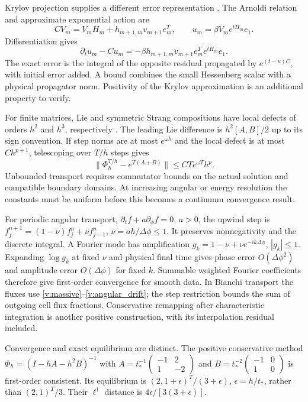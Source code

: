 Krylov projection supplies a different error representation \cite{vSaad1992}. The Arnoldi relation and approximate exponential action are
\begin{equation}
 CV_m=V_mH_m+h_{m+1,m}v_{m+1}e_m^T,\qquad
 u_m=\beta V_me^{tH_m}e_1 .
 \label{v:arnoldi_relation}
\end{equation}
Differentiation gives
\begin{equation}
 \partial_tu_m-Cu_m=
 -\beta h_{m+1,m}v_{m+1}e_m^Te^{tH_m}e_1 .
 \label{v:arnoldi_residual}
\end{equation}
The exact error is the integral of the opposite residual propagated by $e^{(t-u)C}$, with initial error added. A bound combines the small Hessenberg scalar with a physical propagator norm. Positivity of the Krylov approximation is an additional property to verify.

For finite matrices, Lie and symmetric Strang compositions have local defects of orders $h^2$ and $h^3$, respectively \cite{vStrang1968}. The leading Lie difference is $h^2[A,B]/2$ up to its sign convention. If step norms are at most $e^{\omega h}$ and the local defect is at most $C h^{p+1}$, telescoping over $T/h$ steps gives
\begin{equation}
 \|\Phi_h^{T/h}-e^{T(A+B)}\|\le CTe^{\omega T}h^p .
 \label{v:splitting_bound}
\end{equation}
Unbounded transport requires commutator bounds on the actual solution and compatible boundary domains. At increasing angular or energy resolution the constants must be uniform before this becomes a continuum convergence result.

For periodic angular transport, $\partial_tf+a\partial_\phi f=0$, $a>0$, the upwind step is $f_j^{n+1}=(1-\nu)f_j^n+\nu f_{j-1}^n$, $\nu=ah/\Delta\phi\le1$. It preserves nonnegativity and the discrete integral. A Fourier mode has amplification $g_k=1-\nu+\nu e^{-ik\Delta\phi}$, $|g_k|\le1$. Expanding $\log g_k$ at fixed $\nu$ and physical final time gives phase error $O(\Delta\phi^2)$ and amplitude error $O(\Delta\phi)$ for fixed $k$. Summable weighted Fourier coefficients therefore give first-order convergence for smooth data. In Bianchi transport the fluxes use \eqref{v:massive}--\eqref{v:angular_drift}; the step restriction bounds the sum of outgoing cell flux fractions. Conservative remapping after characteristic integration is another positive construction, with its interpolation residual included.

Convergence and exact equilibrium are distinct. The positive conservative method $\Phi_h=(I-hA-h^2B)^{-1}$ with
$A=t_*^{-1}\left(\begin{smallmatrix}-1&2\\1&-2\end{smallmatrix}\right)$ and
$B=t_*^{-2}\left(\begin{smallmatrix}-1&0\\1&0\end{smallmatrix}\right)$ is first-order consistent. Its equilibrium is $(2,1+\epsilon)^T/(3+\epsilon)$, $\epsilon=h/t_*$, rather than $(2,1)^T/3$. Their $\ell^1$ distance is $4\epsilon/[3(3+\epsilon)]$.

